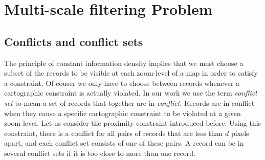 \section{Multi-scale filtering Problem}
\label{sec:background}




\subsection{Conflicts and conflict sets}
\label{sec:conflicts}
The principle of constant information density implies that we must choose a subset of the records to be visible at each zoom-level of a map in order to satisfy a constraint. Of couser we only have to choose between records whenever a cartographic constraint is actually violated. In our work we use the term \emph{conflict set} to mean a set of records that together are in \emph{conflict}. Records are in conflict when they cause a specific cartographic constraint to be violated at a given zoom-level. Let us consider the proximity constraint introduced before. Using this constraint, there is a conflict for all pairs of records that are less than $d$ pixels apart, and each conflict set consists of one of these pairs. A record can be in several conflict sets if it is too close to more than one record.


